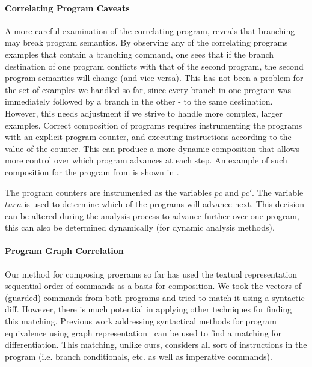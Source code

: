 \paragraph{Correlating Program Caveats}
A more careful examination of the correlating program, reveals that branching may break program semantics. By observing any of the correlating programs examples that contain a branching  command, one sees that if the branch destination of one program conflicts with that of the second program, the second program semantics will change (and vice versa). This has not been a problem for the set of examples we handled so far, since every branch in one program was immediately followed by a branch in the other - to the same destination. However, this needs adjustment if we strive to handle more complex, larger examples. Correct composition of programs requires instrumenting the programs with an explicit program counter, and executing instructions according to the value of the counter. This can produce a more dynamic composition that allows more control over which program advances at each step. An example of such composition for the program from  is shown in .



The program counters are instrumented as the variables $pc$ and $pc'$. The variable $turn$ is used to determine which of the programs will advance next. This decision can be altered during the analysis process to advance further over one program, this can also be determined dynamically (for dynamic analysis methods).

\paragraph{Program Graph Correlation}
Our method for composing programs so far has used the textual representation sequential order of commands as a basis for composition. We took the vectors of (guarded) commands from both programs and tried to match it using a syntactic diff. However, there is much potential in applying other techniques for finding this matching. Previous work addressing syntactical methods for program equivalence using graph representation~\cite{Horwitz89,Horwitz90} can be used to find a matching for differentiation. This matching, unlike ours, considers all sort of instructions in the program (i.e. branch conditionals, etc. as well as imperative commands).

